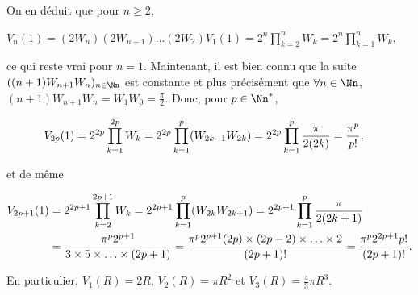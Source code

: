 {{On en déduit que pour $n\geqslant2$,

\begin{center}
$V_n(1)=(2W_n)(2W_{n-1})\ldots(2W_2)V_1(1)=2^n\prod_{k=2}^{n}W_k=2^n\prod_{k=1}^{n}W_k$,
\end{center} 

 ce qui reste vrai pour $n=1$. Maintenant, il est bien connu que la suite $((n+1)W_{n+1}W_n)_{n\in\Nn}$ est constante et plus précisément que $\forall n\in\Nn$, $(n+1)W_{n+1}W_n=W_1W_0= \frac{\pi}{2}$. Donc, pour $p\in\Nn^*$,

\begin{align*}\ensuremath
V_{2p}(1)&=2^{2p}\prod_{k=1}^{2p}W_k=2^{2p}\prod_{k=1}^{p}(W_{2k-1}W_{2k})=2^{2p}\prod_{k=1}^{p} \frac{\pi}{2(2k)}= \frac{\pi^p}{p!},
\end{align*}

et de même

\begin{align*}\ensuremath
V_{2p+1}(1)&=2^{2p+1}\prod_{k=2}^{2p+1}W_k=2^{2p+1}\prod_{k=1}^{p}(W_{2k}W_{2k+1})=2^{2p+1}\prod_{k=1}^{p} \frac{\pi}{2(2k+1)}\\
 &= \frac{\pi^p2^{p+1}}{3\times5\times\ldots\times(2p+1)}= \frac{\pi^p2^{p+1}(2p)\times(2p-2)\times\ldots\times2}{(2p+1)!}= \frac{\pi^p2^{2p+1}p!}{(2p+1)!}.
\end{align*}

\begin{center}
\end{center}

En particulier, $V_1(R)=2R$, $V_2(R)=\pi R^2$ et $V_3(R)= \frac{4}{3}\pi R^3$.
}
}
